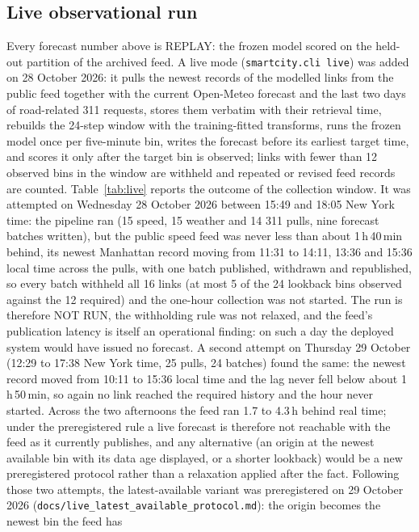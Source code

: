 \subsection{Live observational run}
Every forecast number above is REPLAY: the frozen model scored on the held-out partition of the archived feed. A
live mode (\texttt{smartcity.cli live}) was added on 28 October 2026: it pulls the newest records of the modelled
links from the public feed together with the current Open-Meteo forecast and the last two days of road-related 311
requests, stores them verbatim with their retrieval time, rebuilds the 24-step window with the training-fitted
transforms, runs the frozen model once per five-minute bin, writes the forecast before its earliest target time, and
scores it only after the target bin is observed; links with fewer than 12 observed bins in the window are withheld
and repeated or revised feed records are counted. Table~\ref{tab:live} reports the outcome of the collection
window. It was attempted on Wednesday 28 October 2026 between 15:49 and 18:05 New York time: the pipeline ran (15
speed, 15 weather and 14 311 pulls, nine forecast batches written), but the public speed feed was never less than about
1\,h\,40\,min behind, its newest Manhattan record moving from 11:31 to 14:11, 13:36 and 15:36 local time across the
pulls, with one batch published, withdrawn and republished, so every batch withheld all 16 links (at most 5 of the 24
lookback bins observed against the 12 required) and the one-hour collection was not started. The run is therefore NOT
RUN, the withholding rule was not relaxed, and the feed's publication latency is itself an operational finding: on such
a day the deployed system would have issued no forecast. A second attempt on Thursday 29 October (12:29 to 17:38 New
York time, 25 pulls, 24 batches) found the same: the newest record moved from 10:11 to 15:36 local time and the lag
never fell below about 1\,h\,50\,min, so again no link reached the required history and the hour never started.
Across the two afternoons the feed ran 1.7 to 4.3\,h behind real time; under the preregistered rule a live forecast is
therefore not reachable with the feed as it currently publishes, and any alternative (an origin at the newest
available bin with its data age displayed, or a shorter lookback) would be a new preregistered protocol rather than a
relaxation applied after the fact. Following those two attempts, the latest-available variant was preregistered on
29 October 2026 (\texttt{docs/live\_latest\_available\_protocol.md}): the origin becomes the newest bin the feed has
